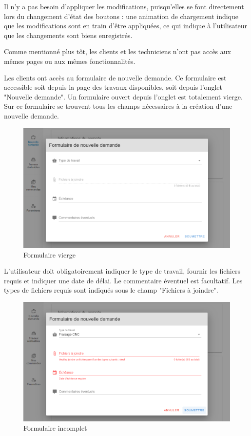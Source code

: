 \documentclass[
    iai, %
    eai, %
]{heig-tb}
\begin{document}
Il n'y a pas besoin d'appliquer les modifications, puisqu'elles se font directement lors du changement d'état des boutons : une animation de chargement indique que les modifications sont en train d'être appliquées, ce qui indique à l'utilisateur que les changements sont biens enregistrés.

\newpage
Comme mentionné plus tôt, les clients et les techniciens n'ont pas accès aux mêmes pages ou aux mêmes fonctionnalités.

Les clients ont accès au formulaire de nouvelle demande. Ce formulaire est accessible soit depuis la page des travaux disponibles, soit depuis l'onglet "Nouvelle demande".
Un formulaire ouvert depuis l'onglet est totalement vierge. Sur ce formulaire se trouvent tous les champs nécessaires à la création d'une nouvelle demande.

\begin{figure}[h]
  \includegraphics[width=14cm]{ui_submit1.PNG}
  \caption{Formulaire vierge}
\end{figure}

L'utilisateur doit obligatoirement indiquer le type de travail, fournir les fichiers requis et indiquer une date de délai. Le commentaire éventuel est facultatif.
Les types de fichiers requis sont indiqués sous le champ "Fichiers à joindre".

\begin{figure}[h]
  \includegraphics[width=14cm]{ui_submit2.PNG}
  \caption{Formulaire incomplet}
\end{figure}
\end{document}
